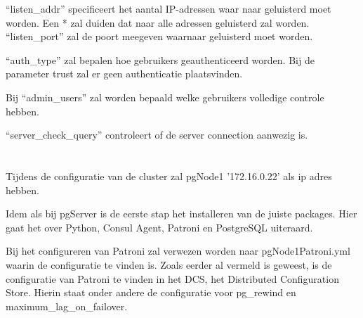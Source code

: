 
“listen\_addr” specificeert het aantal IP-adressen waar naar geluisterd moet worden. Een * zal duiden dat naar alle adressen geluisterd zal worden. “listen\_port” zal de poort meegeven waarnaar geluisterd moet worden.

“auth\_type” zal bepalen hoe gebruikers geauthenticeerd worden. Bij de parameter trust zal er geen authenticatie plaatsvinden.

Bij “admin\_users” zal worden bepaald welke gebruikers volledige controle hebben.


“server\_check\_query” controleert of de server connection aanwezig is.


\section{}
\label{sec:pgNode1}
Tijdens de configuratie van de cluster zal pgNode1 '172.16.0.22' als ip adres hebben.


Idem als bij pgServer is de eerste stap het installeren van de juiste packages. Hier gaat het over Python, Consul Agent, Patroni en PostgreSQL uiteraard.

Bij het configureren van Patroni zal verwezen worden naar pgNode1Patroni.yml waarin de configuratie te vinden is. Zoals eerder al vermeld is geweest, is de configuratie van Patroni te vinden in het DCS, het Distributed Configuration Store. Hierin staat onder andere de configuratie voor pg\_rewind en  maximum\_lag\_on\_failover.

